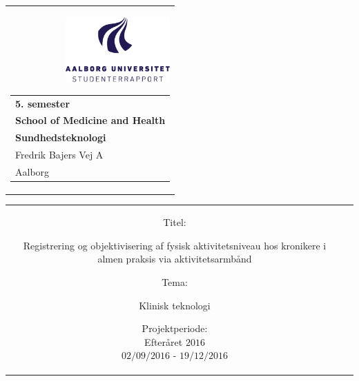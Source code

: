 % 
\thispagestyle{empty}
\begin{nopagebreak}
{\samepage 

\begin{tabular}{r}
\parbox{\textwidth}{ 
 {\includegraphics[height=2.5cm]{figures/aaulogo-da.png}}
\hfill \hspace{2cm} \parbox{8cm}
{\begin{tabular}{l} %
{\small \textbf{5. semester}}\\
{\small \textbf{School of Medicine and Health}}\\
{\small \textbf{Sundhedsteknologi}}\\
{\small Fredrik Bajers Vej $7$A} \\
{\small $9220$ Aalborg} \\
\end{tabular}}}
\end{tabular}

\hspace{-1.5cm}\begin{tabular}{cc}
\parbox{7cm}{
\begin{description}

\item {Titel:}

Registrering og objektivisering af fysisk aktivitetsniveau hos kronikere i almen praksis via aktivitetsarmbånd\\

\item {Tema:} 


Klinisk teknologi\\

\end{description}

\parbox{8cm}{

\begin{description}
\item {Projektperiode:}\\
   Efteråret $2016$\\
   $02/09/2016$ - $19/12/2016$\\
   

\end{description}}}
\end{tabular}}
\end{nopagebreak}
